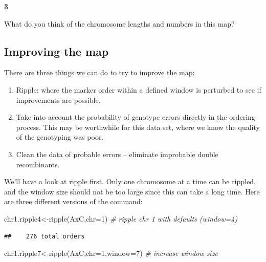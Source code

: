\documentclass[
]{book}
\makeatletter
\newenvironment{Shaded}{\begin{snugshade}}{\end{snugshade}}
\newcommand{\AttributeTok}[1]{\textcolor[rgb]{0.77,0.63,0.00}{#1}}
\newcommand{\CommentTok}[1]{\textcolor[rgb]{0.56,0.35,0.01}{\textit{#1}}}
\newcommand{\DecValTok}[1]{\textcolor[rgb]{0.00,0.00,0.81}{#1}}
\newcommand{\FunctionTok}[1]{\textcolor[rgb]{0.00,0.00,0.00}{#1}}
\newcommand{\NormalTok}[1]{#1}
\newcommand{\OtherTok}[1]{\textcolor[rgb]{0.56,0.35,0.01}{#1}}
\newenvironment{kframe}{%
\medskip{}
\setlength{\fboxsep}{.8em}
 \def\at@end@of@kframe{}%
 \ifinner\ifhmode%
  \def\at@end@of@kframe{\end{minipage}}%
  \begin{minipage}{\columnwidth}%
 \fi\fi%
 \def\FrameCommand##1{\hskip\@totalleftmargin \hskip-\fboxsep
 \colorbox{shadecolor}{##1}\hskip-\fboxsep
     \hskip-\linewidth \hskip-\@totalleftmargin \hskip\columnwidth}%
 \MakeFramed {\advance\hsize-\width
   \@totalleftmargin\z@ \linewidth\hsize
   \@setminipage}}%
 {\par\unskip\endMakeFramed%
 \at@end@of@kframe}
\newenvironment{rmdblock}[1]
  {
  \begin{itemize}
  \renewcommand{\labelitemi}{
    \raisebox{-.7\height}[0pt][0pt]{
      {\setkeys{Gin}{width=3em,keepaspectratio}\texttt{[image: images/\#1]}}
    }
  }
  \setlength{\fboxsep}{1em}
  \begin{kframe}
  \item
  }
  {
  \end{kframe}
  \end{itemize}
  }
\newenvironment{rmdquiz}
  {\begin{rmdblock}{quiz}}
  {\end{rmdblock}}
\makeatother
\begin{document}
\begin{rmdquiz}
\textbf{3}

What do you think of the chromosome lengths and numbers in this map?
\end{rmdquiz}

\hypertarget{improving-the-map}{%
\subsection{Improving the map}\label{improving-the-map}}

There are three things we can do to try to improve the map:

\begin{enumerate}
\def\labelenumi{\arabic{enumi}.}
\item
  Ripple; where the marker order within a defined window is perturbed to see if improvements are possible.
\item
  Take into account the probability of genotype errors directly in the ordering process. This may be worthwhile for this data set, where we know the quality of the genotyping was poor.
\item
  Clean the data of probable errors -- eliminate improbable double recombinants.
\end{enumerate}

We'll have a look at ripple first. Only one chromosome at a time can be rippled, and the window size should not be too large since this can take a long time. Here are three different versions of the command:

\begin{Shaded}
\begin{Highlighting}[]
\NormalTok{chr1.ripple4}\OtherTok{\textless{}{-}}\FunctionTok{ripple}\NormalTok{(AxC,}\AttributeTok{chr=}\DecValTok{1}\NormalTok{)     }\CommentTok{\# ripple chr 1 with defaults (window=4)}
\end{Highlighting}
\end{Shaded}

\begin{verbatim}
##    276 total orders
\end{verbatim}

\begin{Shaded}
\begin{Highlighting}[]
\NormalTok{chr1.ripple7}\OtherTok{\textless{}{-}}\FunctionTok{ripple}\NormalTok{(AxC,}\AttributeTok{chr=}\DecValTok{1}\NormalTok{,}\AttributeTok{window=}\DecValTok{7}\NormalTok{)    }\CommentTok{\# increase window size }
\end{Highlighting}
\end{Shaded}
\end{document}

